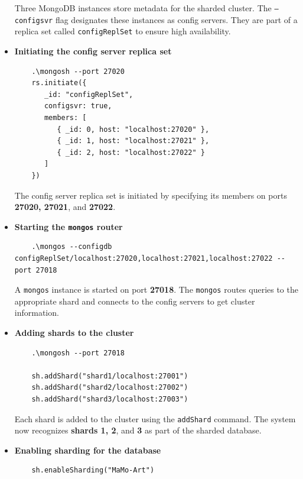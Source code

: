 \documentclass[a4paper,12pt]{article}
\begin{document}
\begin{itemize}
            Three MongoDB instances store metadata for the sharded cluster. The \texttt{--configsvr} flag designates these instances as config servers. They are part of a replica set called \texttt{configReplSet} to ensure high availability.

      \item \textbf{Initiating the config server replica set}

            \begin{lstlisting}
    .\mongosh --port 27020
    rs.initiate({
       _id: "configReplSet",
       configsvr: true,
       members: [
          { _id: 0, host: "localhost:27020" },
          { _id: 1, host: "localhost:27021" },
          { _id: 2, host: "localhost:27022" }
       ]
    })
    \end{lstlisting}

            The config server replica set is initiated by specifying its members on ports \textbf{27020, 27021}, and \textbf{27022}.

      \item \textbf{Starting the \texttt{mongos} router}

            \begin{lstlisting}
    .\mongos --configdb configReplSet/localhost:27020,localhost:27021,localhost:27022 --port 27018
    \end{lstlisting}

            A \texttt{mongos} instance is started on port \textbf{27018}. The \texttt{mongos} routes queries to the appropriate shard and connects to the config servers to get cluster information.

      \item \textbf{Adding shards to the cluster}

            \begin{lstlisting}
    .\mongosh --port 27018

    sh.addShard("shard1/localhost:27001")
    sh.addShard("shard2/localhost:27002")
    sh.addShard("shard3/localhost:27003")
    \end{lstlisting}

            Each shard is added to the cluster using the \texttt{addShard} command. The system now recognizes \textbf{shards 1, 2}, and \textbf{3} as part of the sharded database.

      \item \textbf{Enabling sharding for the database}

            \begin{lstlisting}
    sh.enableSharding("MaMo-Art")
    \end{lstlisting}


\end{itemize}
\end{document}

